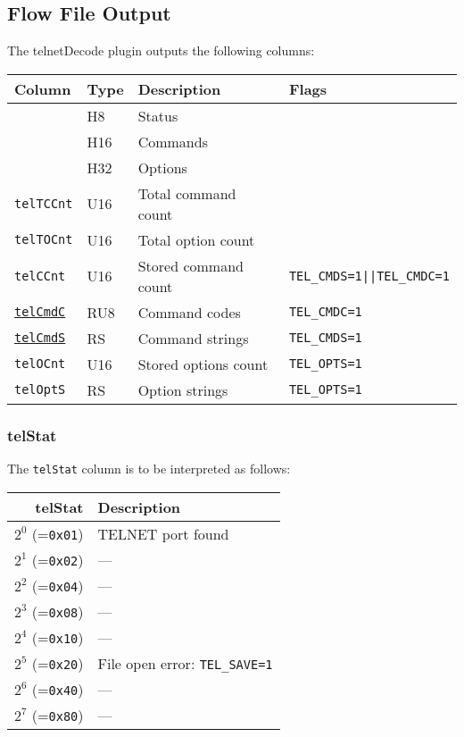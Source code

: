 \documentclass[documentation]{subfiles}
\begin{document}
\subsection{Flow File Output}
The telnetDecode plugin outputs the following columns:
\begin{longtable}{llll}
    \toprule
    {\bf Column} & {\bf Type} & {\bf Description} & {\bf Flags}\\
    \midrule\endhead%
    {\tt \nameref{telStat}}          & H8  & Status \\
    {\tt \nameref{telCmdBF}}         & H16 & Commands \\
    {\tt \nameref{telOptBF}}         & H32 & Options \\
    {\tt telTCCnt}                   & U16 & Total command count \\
    {\tt telTOCnt}                   & U16 & Total option count \\
    {\tt telCCnt}                    & U16 & Stored command count & {\tt TEL\_CMDS=1||TEL\_CMDC=1}\\
    {\tt \hyperref[telCmd]{telCmdC}} & RU8 & Command codes        & {\tt TEL\_CMDC=1}\\
    {\tt \hyperref[telCmd]{telCmdS}} & RS  & Command strings      & {\tt TEL\_CMDS=1}\\
    {\tt telOCnt}                    & U16 & Stored options count & {\tt TEL\_OPTS=1}\\
    {\tt telOptS}                    & RS  & Option strings       & {\tt TEL\_OPTS=1}\\
    \bottomrule
\end{longtable}

\subsubsection{telStat}\label{telStat}
The {\tt telStat} column is to be interpreted as follows:
\begin{longtable}{rl}
    \toprule
    {\bf telStat} & {\bf Description}\\
    \midrule\endhead%
    $2^0$ (={\tt 0x01}) & TELNET port found\\
    $2^1$ (={\tt 0x02}) & ---\\
    $2^2$ (={\tt 0x04}) & ---\\
    $2^3$ (={\tt 0x08}) & ---\\
    $2^4$ (={\tt 0x10}) & ---\\
    $2^5$ (={\tt 0x20}) & File open error: {\tt TEL\_SAVE=1}\\
    $2^6$ (={\tt 0x40}) & ---\\
    $2^7$ (={\tt 0x80}) & ---\\
    \bottomrule
\end{longtable}
\end{document}
